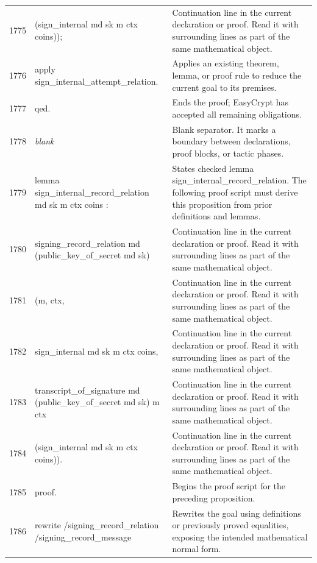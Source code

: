 \documentclass[10pt]{article}
\begin{document}
\begin{longtable}{r L{0.53\textwidth} L{0.37\textwidth}}
1775 & {\ttfamily\scriptsize             (sign\_internal md sk m ctx coins));} & Continuation line in the current declaration or proof.  Read it with surrounding lines as part of the same mathematical object. \\
1776 & {\ttfamily\scriptsize    apply sign\_internal\_attempt\_relation.} & Applies an existing theorem, lemma, or proof rule to reduce the current goal to its premises. \\
1777 & {\ttfamily\scriptsize qed.} & Ends the proof; EasyCrypt has accepted all remaining obligations. \\
1778 & {\ttfamily\scriptsize \emph{blank}} & Blank separator.  It marks a boundary between declarations, proof blocks, or tactic phases. \\
1779 & {\ttfamily\scriptsize lemma sign\_internal\_record\_relation md sk m ctx coins :} & States checked lemma sign\_internal\_record\_relation.  The following proof script must derive this proposition from prior definitions and lemmas. \\
1780 & {\ttfamily\scriptsize   signing\_record\_relation md (public\_key\_of\_secret md sk)} & Continuation line in the current declaration or proof.  Read it with surrounding lines as part of the same mathematical object. \\
1781 & {\ttfamily\scriptsize     (m, ctx,} & Continuation line in the current declaration or proof.  Read it with surrounding lines as part of the same mathematical object. \\
1782 & {\ttfamily\scriptsize      sign\_internal md sk m ctx coins,} & Continuation line in the current declaration or proof.  Read it with surrounding lines as part of the same mathematical object. \\
1783 & {\ttfamily\scriptsize      transcript\_of\_signature md (public\_key\_of\_secret md sk) m ctx} & Continuation line in the current declaration or proof.  Read it with surrounding lines as part of the same mathematical object. \\
1784 & {\ttfamily\scriptsize        (sign\_internal md sk m ctx coins)).} & Continuation line in the current declaration or proof.  Read it with surrounding lines as part of the same mathematical object. \\
1785 & {\ttfamily\scriptsize proof.} & Begins the proof script for the preceding proposition. \\
1786 & {\ttfamily\scriptsize rewrite /signing\_record\_relation /signing\_record\_message} & Rewrites the goal using definitions or previously proved equalities, exposing the intended mathematical normal form. \\

\end{longtable}
\end{document}
